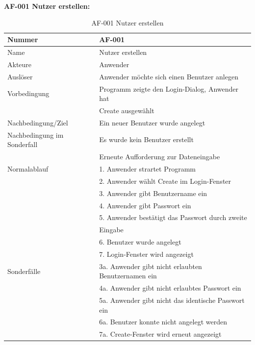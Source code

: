 \documentclass[12pt,a4paper,bibliography=totocnumbered,listof=totocnumbered]{scrartcl}
\begin{document}
\textbf{AF-001 Nutzer erstellen:}
\begin{table}[!h]
	\centering
	\begin{tabular}{|l|l|}
		\hline
		Nummer & AF-001\\
		\hline
		Name & Nutzer erstellen\\
		\hline
		Akteure & Anwender\\
		\hline
		Auslöser & Anwender möchte sich einen Benutzer anlegen\\
		\hline
		Vorbedingung & Programm zeigte den Login-Dialog, Anwender hat \\ &  Create ausgewählt\\
		\hline
		Nachbedingung/Ziel & Ein neuer Benutzer wurde angelegt \\
		\hline
		Nachbedingung im Sonderfall & Es wurde kein Benutzer erstellt \\ & Erneute Aufforderung zur Dateneingabe\\
		\hline
		Normalablauf & 1. Anwender strartet Programm \\ & 2. Anwender wählt Create im Login-Fenster\\ & 3. Anwender gibt Benutzername ein \\ & 4. Anwender gibt Passwort ein \\ & 5. Anwender bestätigt das Passwort durch zweite\\ &Eingabe\\& 6. Benutzer wurde angelegt\\& 7. Login-Fenster wird angezeigt \\
		\hline
		Sonderfälle & 3a. Anwender gibt nicht erlaubten Benutzernamen ein \\ & 4a. Anwender gibt nicht erlaubtes Passwort ein \\& 5a. Anwender gibt nicht das identische Passwort ein\\& 6a. Benutzer konnte nicht angelegt werden \\& 7a. Create-Fenster wird erneut angezeigt\\
		\hline
	\end{tabular}
	\caption{AF-001 Nutzer erstellen}
	\label{tab:AF-001 Nutzer erstellen}
\end{table}
\end{document}
